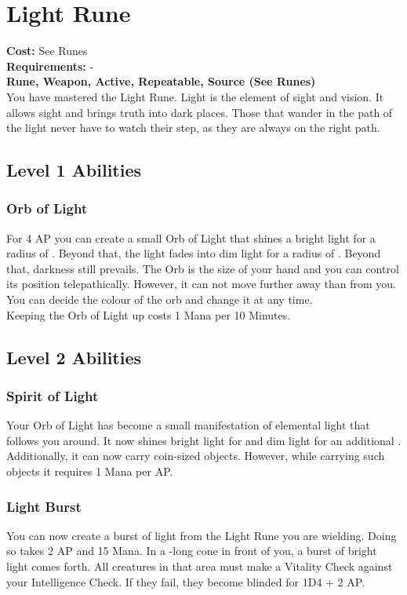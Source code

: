 \section{Light Rune}\label{rune:light}
\textbf{Cost:} See Runes\\
\textbf{Requirements:} -\\
\textbf{Rune, Weapon, Active, Repeatable, Source (See Runes)}\\
You have mastered the Light Rune.
Light is the element of sight and vision.
It allows sight and brings truth into dark places. Those that wander in the path of the light never have to watch their step, as they are always on the right path.
\subsection{Level 1 Abilities}

\subsubsection{Orb of Light}
For 4 AP you can create a small Orb of Light that shines a bright light for a radius of .
Beyond that, the light fades into dim light for a radius of .
Beyond that, darkness still prevails.
The Orb is the size of your hand and you can control its position telepathically.
However, it can not move further away than  from you.
You can decide the colour of the orb and change it at any time. \\
Keeping the Orb of Light up costs 1 Mana per 10 Minutes.


\subsection{Level 2 Abilities}

\subsubsection{Spirit of Light}
Your Orb of Light has become a small manifestation of elemental light that follows you around.
It now shines bright light for  and dim light for an additional .\\
Additionally, it can now carry coin-sized objects.
However, while carrying such objects it requires 1 Mana per AP.

\subsubsection{Light Burst}
You can now create a burst of light from the Light Rune you are wielding.
Doing so takes 2 AP and 15 Mana.
In a -long cone in front of you, a burst of bright light comes forth.
All creatures in that area must make a Vitality Check against your Intelligence Check.
If they fail, they become blinded for 1D4 + 2 AP.

